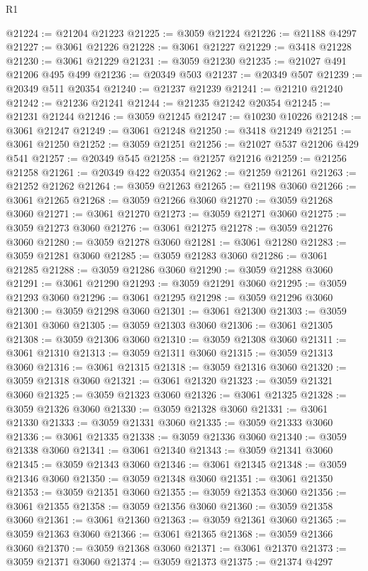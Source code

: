 \begin{lexlean}{R1}
\begin{coremodule}
@21224 := @21204 @21223
@21225 := @3059 @21224
@21226 := @21188 @4297
@21227 := @3061 @21226
@21228 := @3061 @21227
@21229 := @3418 @21228
@21230 := @3061 @21229
@21231 := @3059 @21230
@21235 := @21027 @491 @21206 @495 @499
@21236 := @20349 @503
@21237 := @20349 @507
@21239 := @20349 @511 @20354
@21240 := @21237 @21239
@21241 := @21210 @21240
@21242 := @21236 @21241
@21244 := @21235 @21242 @20354
@21245 := @21231 @21244
@21246 := @3059 @21245
@21247 := @10230 @10226
@21248 := @3061 @21247
@21249 := @3061 @21248
@21250 := @3418 @21249
@21251 := @3061 @21250
@21252 := @3059 @21251
@21256 := @21027 @537 @21206 @429 @541
@21257 := @20349 @545
@21258 := @21257 @21216
@21259 := @21256 @21258
@21261 := @20349 @422 @20354
@21262 := @21259 @21261
@21263 := @21252 @21262
@21264 := @3059 @21263
@21265 := @21198 @3060
@21266 := @3061 @21265
@21268 := @3059 @21266 @3060
@21270 := @3059 @21268 @3060
@21271 := @3061 @21270
@21273 := @3059 @21271 @3060
@21275 := @3059 @21273 @3060
@21276 := @3061 @21275
@21278 := @3059 @21276 @3060
@21280 := @3059 @21278 @3060
@21281 := @3061 @21280
@21283 := @3059 @21281 @3060
@21285 := @3059 @21283 @3060
@21286 := @3061 @21285
@21288 := @3059 @21286 @3060
@21290 := @3059 @21288 @3060
@21291 := @3061 @21290
@21293 := @3059 @21291 @3060
@21295 := @3059 @21293 @3060
@21296 := @3061 @21295
@21298 := @3059 @21296 @3060
@21300 := @3059 @21298 @3060
@21301 := @3061 @21300
@21303 := @3059 @21301 @3060
@21305 := @3059 @21303 @3060
@21306 := @3061 @21305
@21308 := @3059 @21306 @3060
@21310 := @3059 @21308 @3060
@21311 := @3061 @21310
@21313 := @3059 @21311 @3060
@21315 := @3059 @21313 @3060
@21316 := @3061 @21315
@21318 := @3059 @21316 @3060
@21320 := @3059 @21318 @3060
@21321 := @3061 @21320
@21323 := @3059 @21321 @3060
@21325 := @3059 @21323 @3060
@21326 := @3061 @21325
@21328 := @3059 @21326 @3060
@21330 := @3059 @21328 @3060
@21331 := @3061 @21330
@21333 := @3059 @21331 @3060
@21335 := @3059 @21333 @3060
@21336 := @3061 @21335
@21338 := @3059 @21336 @3060
@21340 := @3059 @21338 @3060
@21341 := @3061 @21340
@21343 := @3059 @21341 @3060
@21345 := @3059 @21343 @3060
@21346 := @3061 @21345
@21348 := @3059 @21346 @3060
@21350 := @3059 @21348 @3060
@21351 := @3061 @21350
@21353 := @3059 @21351 @3060
@21355 := @3059 @21353 @3060
@21356 := @3061 @21355
@21358 := @3059 @21356 @3060
@21360 := @3059 @21358 @3060
@21361 := @3061 @21360
@21363 := @3059 @21361 @3060
@21365 := @3059 @21363 @3060
@21366 := @3061 @21365
@21368 := @3059 @21366 @3060
@21370 := @3059 @21368 @3060
@21371 := @3061 @21370
@21373 := @3059 @21371 @3060
@21374 := @3059 @21373
@21375 := @21374 @4297

\end{coremodule}
\end{lexlean}
